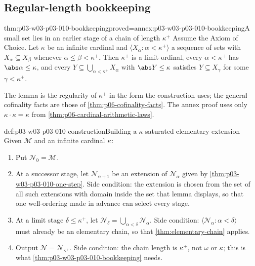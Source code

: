 \subsection{Regular-length bookkeeping}
\label{sec:p03-w03-p03-010-bookkeeping}

\begin{hblemma}{thm:p03-w03-p03-010-bookkeeping}{proved=annex:p03-w03-p03-010-bookkeeping}{A small set lies in an earlier stage of a chain of length \(\kappa^+\)}
Assume the Axiom of Choice.  Let \(\kappa\) be an infinite cardinal and
\(\langle X_\alpha:\alpha<\kappa^+\rangle\) a sequence of sets with
\(X_\alpha\subseteq X_\beta\) whenever \(\alpha\leq\beta<\kappa^+\).
Then \(\kappa^+\) is a limit ordinal, every \(\alpha<\kappa^+\) has
\(\abs\alpha\leq\kappa\), and every
\(Y\subseteq\bigcup_{\alpha<\kappa^+}X_\alpha\) with \(\abs Y\leq\kappa\)
satisfies \(Y\subseteq X_\gamma\) for some \(\gamma<\kappa^+\).
\end{hblemma}

The lemma is the regularity of \(\kappa^+\) in the form the construction
uses; the general cofinality facts are those of
\cref{thm:p06-cofinality-facts}.  The annex proof uses only
\(\kappa\cdot\kappa=\kappa\) from \cref{thm:p06-cardinal-arithmetic-laws}.

\begin{hbmethod}{def:p03-w03-p03-010-construction}{Building a \(\kappa\)-saturated elementary extension}
Given \(\mathcal M\) and an infinite cardinal \(\kappa\):
\begin{enumerate}
  \item Put \(\mathcal N_0=\mathcal M\).
  \item At a successor stage, let \(\mathcal N_{\alpha+1}\) be an
        extension of \(\mathcal N_\alpha\) given by
        \cref{thm:p03-w03-p03-010-one-step}.  Side condition: the
        extension is chosen from the set of all such extensions with domain
        inside the set that lemma displays, so that one well-ordering made
        in advance can select every stage.
  \item At a limit stage \(\delta\leq\kappa^+\), let
        \(\mathcal N_\delta=\bigcup_{\alpha<\delta}\mathcal N_\alpha\).
        Side condition: \(\langle\mathcal N_\alpha:\alpha<\delta\rangle\)
        must already be an elementary chain, so that
        \cref{thm:elementary-chain} applies.
  \item Output \(\mathcal N=\mathcal N_{\kappa^+}\).  Side condition: the
        chain length is \(\kappa^+\), not \(\omega\) or \(\kappa\); this is
        what \cref{thm:p03-w03-p03-010-bookkeeping} needs.
\end{enumerate}
\end{hbmethod}


